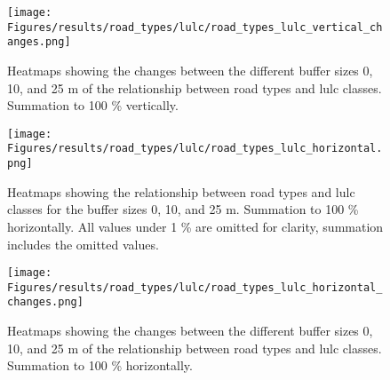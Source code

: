 \begin{figure}[!htb]
    \centering
    \texttt{[image: Figures/results/road\_types/lulc/road\_types\_lulc\_vertical\_changes.png]}
    \caption[Heatmaps of Road Types vs.  Classes, Changes, Vertical Summation]{Heatmaps showing the changes between the different buffer sizes 0, 10, and 25 m of the relationship between road types and \gls{lulc} classes. Summation to 100 \% vertically.}
    \label{app_fig:types_lulc_v_changes}
\end{figure}

\clearpage

\begin{figure}[!htb]
    \centering
    \texttt{[image: Figures/results/road\_types/lulc/road\_types\_lulc\_horizontal.png]}
    \caption[Heatmaps of Road Types vs.  Classes, Horizontal Summation]{Heatmaps showing the relationship between road types and \gls{lulc} classes for the buffer sizes 0, 10, and 25 m. Summation to 100 \% horizontally. All values under 1 \% are omitted for clarity, summation includes the omitted values.}
    \label{app_fig:types_lulc_h}
\end{figure}

\begin{figure}[!htb]
    \centering
    \texttt{[image: Figures/results/road\_types/lulc/road\_types\_lulc\_horizontal\_changes.png]}
    \caption[Heatmaps of Road Types vs.  Classes, Changes, Horizontal Summation]{Heatmaps showing the changes between the different buffer sizes 0, 10, and 25 m of the relationship between road types and \gls{lulc} classes. Summation to 100 \% horizontally.}
    \label{app_fig:types_lulc_h_changes}
\end{figure}

\clearpage


